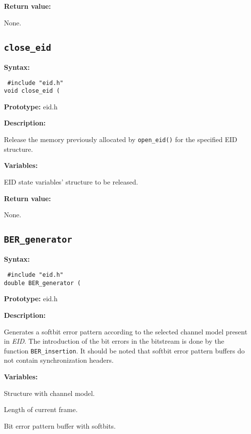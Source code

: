 {\bf Return value: }

        None.


\subsection{{\tt close\_eid}}

{\bf Syntax: }

{\tt
\#include "eid.h"\\
void close\_eid (
}

{\bf Prototype: }    eid.h

{\bf Description: }

Release the memory previously allocated by {\tt open\_eid()} for the
specified EID structure.

{\bf Variables: }
\begin{Descr}{\DescrLen}
\item[\pbox{20mm}{\em EID}] %
        EID state variables' structure to be released.
\end{Descr}

{\bf Return value: }

        None.

\subsection{{\tt BER\_generator}}

{\bf Syntax: }

{\tt
\#include "eid.h"\\
double BER\_generator (
}

{\bf Prototype: }    eid.h

{\bf Description: }

Generates a softbit error pattern according to the selected channel
model present in {\em EID}. The introduction of the bit errors in the
bitstream is done by the function {\tt BER\_insertion}. It should be
noted that softbit error pattern buffers do not contain
synchronization headers.

{\bf Variables: }
\begin{Descr}{\DescrLen}
\item[\pbox{20mm}{\em EID}] %
         Structure with channel model.

\item[\pbox{20mm}{\em lseg}] %
         Length of current frame.

\item[\pbox{20mm}{\em EPbuff}] %
         Bit error pattern buffer with softbits.
\end{Descr}


